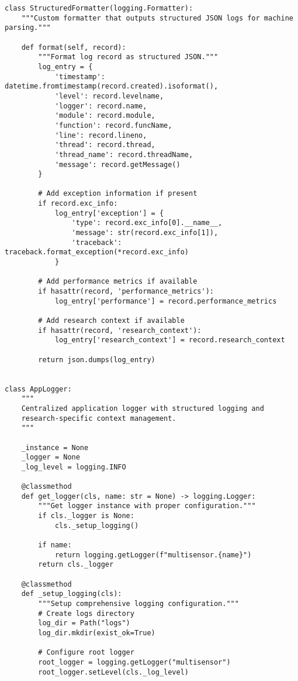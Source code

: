 \documentclass[12pt,a4paper]{article}
\begin{document}
\begin{verbatim}
class StructuredFormatter(logging.Formatter):
    """Custom formatter that outputs structured JSON logs for machine parsing."""
    
    def format(self, record):
        """Format log record as structured JSON."""
        log_entry = {
            'timestamp': datetime.fromtimestamp(record.created).isoformat(),
            'level': record.levelname,
            'logger': record.name,
            'module': record.module,
            'function': record.funcName,
            'line': record.lineno,
            'thread': record.thread,
            'thread_name': record.threadName,
            'message': record.getMessage()
        }
        
        # Add exception information if present
        if record.exc_info:
            log_entry['exception'] = {
                'type': record.exc_info[0].__name__,
                'message': str(record.exc_info[1]),
                'traceback': traceback.format_exception(*record.exc_info)
            }
        
        # Add performance metrics if available
        if hasattr(record, 'performance_metrics'):
            log_entry['performance'] = record.performance_metrics
        
        # Add research context if available
        if hasattr(record, 'research_context'):
            log_entry['research_context'] = record.research_context
        
        return json.dumps(log_entry)


class AppLogger:
    """
    Centralized application logger with structured logging and
    research-specific context management.
    """
    
    _instance = None
    _logger = None
    _log_level = logging.INFO
    
    @classmethod
    def get_logger(cls, name: str = None) -> logging.Logger:
        """Get logger instance with proper configuration."""
        if cls._logger is None:
            cls._setup_logging()
        
        if name:
            return logging.getLogger(f"multisensor.{name}")
        return cls._logger
    
    @classmethod
    def _setup_logging(cls):
        """Setup comprehensive logging configuration."""
        # Create logs directory
        log_dir = Path("logs")
        log_dir.mkdir(exist_ok=True)
        
        # Configure root logger
        root_logger = logging.getLogger("multisensor")
        root_logger.setLevel(cls._log_level)
        

\end{verbatim}
\end{document}
